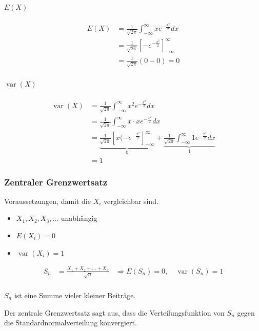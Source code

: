 \documentclass[10pt,a4paper]{scrartcl}
\newif\ifincludeDerivations
\DeclareMathOperator{\var}{var}
\begin{document}
\paragraph{$E(X)$}
\begin{align*}
  E(X) & = \frac{1}{\sqrt{2\pi}} \int_{-\infty}^\infty xe^{-\frac{x^2}{2}} dx \\
       & = \frac{1}{\sqrt{2\pi}} \left[ -e^{-\frac{x^2}{2}} \right]_{-\infty}^\infty \\
       & = \frac{1}{\sqrt{2\pi}} (0-0) = 0
\end{align*}

\paragraph{$\var(X)$}
\begin{align*}
  \var(X) & = \frac{1}{\sqrt{2\pi}} \int_{-\infty}^\infty x^2e^{-\frac{x^2}{2}} dx \\
          & = \frac{1}{\sqrt{2\pi}} \int_{-\infty}^\infty x\cdot xe^{-\frac{x^2}{2}} dx \\
          & = \underbrace{\frac{1}{\sqrt{2\pi}} \left[ x(-e^{-\frac{x^2}{2}} \right]_{-\infty}^\infty}_{0} + 
              \underbrace{\frac{1}{\sqrt{2\pi}} \int_{-\infty}^\infty 1 e^{-\frac{x^2}{2}} dx}_{1} \\
          & = 1
\end{align*}
\fi
\subsubsection{Zentraler Grenzwertsatz}
Voraussetzungen, damit die $X_i$ vergleichbar sind.
\begin{itemize}
\item $X_1, X_2, X_3, \dots$ unabhängig
\item $E(X_i) = 0$ 
\item $\var(X_i) = 1$
\end{itemize}

\begin{align*}
    S_n & = \frac{X_1 + X_2 + \dots + X_n}{\sqrt{n}} &\Rightarrow E(S_n) = 0,\quad \var(S_n) = 1 \\
\end{align*}

$S_n$ ist eine Summe vieler kleiner Beiträge.

\ifincludeDerivations\else
Der zentrale Grenzwertsatz sagt aus, dass die Verteilungsfunktion von $S_n$ gegen die Standardnormalverteilung konvergiert.
\end{document}
